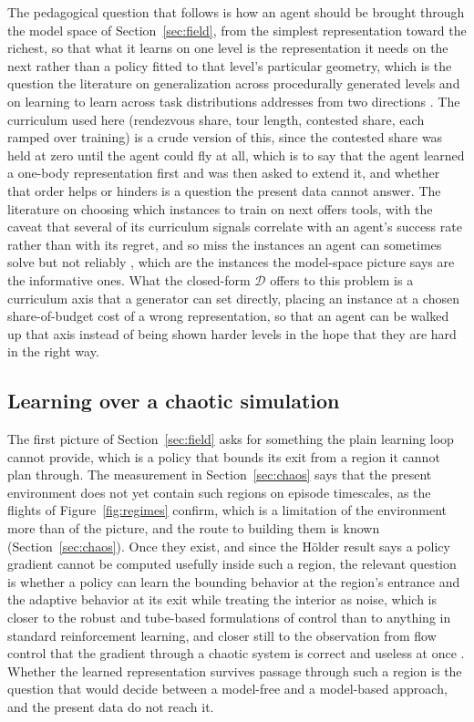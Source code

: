 \documentclass[11pt]{article}
\newcommand{\dd}{\mathcal{D}}
\begin{document}
The pedagogical question that follows is how an agent should be brought
through the model space of Section~\ref{sec:field}, from the simplest
representation toward the richest, so that what it learns
on one level is the representation it needs on the next rather than a policy
fitted to that level's particular geometry, which is the question the
literature on generalization across procedurally generated levels and on
learning to learn across task distributions addresses from two directions
\cite{cobbe2019,kirk2023,finn2017,duan2016,beck2025}. The curriculum used
here (rendezvous share, tour length, contested share, each ramped over
training) is a crude version of this, since the contested share was held at
zero until the agent could fly at all, which is to say that the agent
learned a one-body representation first and was then asked to extend it,
and whether that order helps or hinders is a question the present data
cannot answer. The literature on choosing which instances to train on next
\cite{portelas2020,florensa2018,matiisen2020,dennis2020,jiang2021,jiang2021a,parkerholder2022,jiang2022}
offers tools, with the caveat that several of its curriculum signals
correlate with an agent's success rate rather than with its regret, and so
miss the instances an agent can sometimes solve but not reliably
\cite{rutherford2024}, which are the instances the model-space picture says
are the informative ones. What the closed-form $\dd$ offers to this problem
is a curriculum axis that a generator can set directly, placing an instance
at a chosen share-of-budget cost of a wrong representation, so that an agent
can be walked up that axis instead of being shown harder levels in the hope
that they are hard in the right way.

\subsection{Learning over a chaotic simulation}

The first picture of Section~\ref{sec:field} asks for something the plain
learning loop cannot provide, which is a policy that bounds its exit from a region it cannot plan through. The
measurement in Section~\ref{sec:chaos} says that the present environment
does not yet contain such regions on episode timescales, as the flights of
Figure~\ref{fig:regimes} confirm, which is a limitation of the environment
more than of the picture, and the route to building them is known
(Section~\ref{sec:chaos}). Once they exist, and since
the H\"older result says a policy gradient cannot be computed usefully
inside such a region, the relevant question is whether a policy can learn
the bounding behavior at the region's entrance and the adaptive behavior at
its exit while treating the interior as noise, which is closer to the robust
and tube-based formulations of control \cite{mayne2005,mitchell2005} than to
anything in standard reinforcement learning, and closer still to the
observation from flow control that the gradient through a chaotic system is
correct and useless at once \cite{metz2021,parmas2018,suh2022}. Whether the
learned representation survives passage through such a region is the
question that would decide between a model-free and a model-based approach,
and the present data do not reach it.
\end{document}
